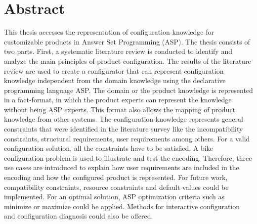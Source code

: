 \section{Abstract}\label{sec: abstract}
This thesis accesses the representation of configuration knowledge for customizable products in Answer Set Programming (ASP). The thesis consists of two parts. 
First, a systematic literature review is conducted to identify and analyze the main principles of product configuration.
The results of the literature review are used to create a configurator that can represent configuration knowledge independent from the domain knowledge using the declarative programming language ASP. 
The domain or the product knowledge is represented in a fact-format, in which the product experts can represent the knowledge without being ASP experts. 
This format also allows the mapping of product knowledge from other systems. 
The configuration knowledge represents general constraints that were identified in the literature survey like the incompatibility constraints, structural requirements, user requirements among others.
For a valid configuration solution, all the constraints have to be satisfied.
A bike configuration problem is used to illustrate and test the encoding. 
Therefore, three use cases are introduced to explain how user requirements are included in the encoding and how the configured product is represented. 
For future work, compatibility constraints, resource constraints and default values could be implemented. 
For an optimal solution, ASP optimization criteria such as minimize or maximize could be applied.
Methods for interactive configuration and configuration diagnosis could also be offered.  


